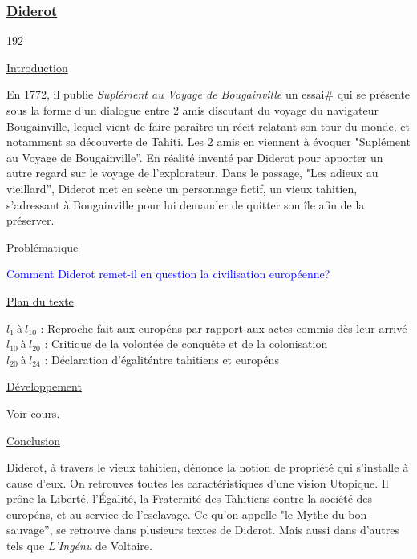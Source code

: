 \documentclass[12pt,a4paper]{article}
\begin{document}
			\subsubsection{\href{.extra/Bio/Diderot.pdf}{Diderot}}
\begin{dingautolist}{192}

\item \underline{Introduction} \par
	En 1772, il publie \textit{Supl\'ement au Voyage de Bougainville} un essai\# qui se pr\'esente sous la forme d'un dialogue entre 2 amis discutant du voyage du navigateur Bougainville, 
	lequel vient de faire para\^itre un r\'ecit relatant son tour du monde, et notamment sa d\'ecouverte de Tahiti.
	Les 2 amis en viennent \`a \'evoquer "Supl\'ement au Voyage de Bougainville''. En r\'ealit\'e invent\'e par Diderot pour apporter un autre regard sur le voyage de l'explorateur.
	Dans le passage, "Les adieux au vieillard'', Diderot met en sc\`ene un personnage fictif, un vieux tahitien, s'adressant \`a Bougainville pour lui demander de quitter son \^ile afin de la pr\'eserver.

\item \underline{Probl\'ematique }\par
	\textcolor{blue}{Comment Diderot remet-il en question la civilisation europ\'eenne?}

\item \underline{Plan du texte} \par
	$l_{1}~$\`a$~l_{10}$ : Reproche fait aux europ\'ens par rapport aux actes commis d\`es leur arriv\'e\\
	$l_{10}~$\`a$~l_{20}$ : Critique de la volont\'ee de conquête et de la colonisation\\
	$l_{20}~$\`a$~l_{24}$ : D\'eclaration d'\'egalit\' entre tahitiens et europ\'ens 

\item \underline{D\'eveloppement} \par
        Voir cours.

\item \underline{Conclusion} \par
	Diderot, \`a travers le vieux tahitien, d\'enonce la notion de propri\'et\'e qui s'installe \`a cause d'eux.
	On retrouves toutes les caract\'eristiques d'une vision Utopique.
	Il prône la Libert\'e, l'\'Egalit\'e, la Fraternit\'e des Tahitiens contre la soci\'et\'e des europ\'ens, et au service de l'esclavage.
	Ce qu'on appelle "le Mythe du bon sauvage'', se retrouve dans plusieurs textes de Diderot. Mais aussi dans d'autres tels que \textit{L'Ing\'enu} de Voltaire.

\end{dingautolist}
 \newpage
\end{document}
